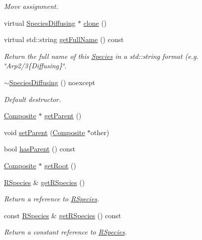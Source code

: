 \begin{DoxyCompactItemize}
\begin{DoxyCompactList}\small\item\em Move assignment. \end{DoxyCompactList}\item 
virtual \hyperlink{classchem_1_1SpeciesDiffusing}{Species\-Diffusing} $\ast$ \hyperlink{classchem_1_1SpeciesDiffusing_a69edbe33378230389a2fb99c4ca2b5ce}{clone} ()
\item 
virtual std\-::string \hyperlink{classchem_1_1SpeciesDiffusing_a03eba31a17a3713e8c45cc0952e922bb}{get\-Full\-Name} () const 
\begin{DoxyCompactList}\small\item\em Return the full name of this \hyperlink{classchem_1_1Species}{Species} in a std\-::string format (e.\-g. \char`\"{}\-Arp2/3\{\-Diffusing\}\char`\"{}. \end{DoxyCompactList}\item 
\hyperlink{classchem_1_1SpeciesDiffusing_a683ab39a97cef1b68be11c68b476a840}{$\sim$\-Species\-Diffusing} () noexcept
\begin{DoxyCompactList}\small\item\em Default destructor. \end{DoxyCompactList}\item 
\hyperlink{classchem_1_1Composite}{Composite} $\ast$ \hyperlink{classchem_1_1Species_acdc83314b339310022d56e024f124a34}{get\-Parent} ()
\item 
void \hyperlink{classchem_1_1Species_a50e1e828d0b8a03efc9354e2c00174f5}{set\-Parent} (\hyperlink{classchem_1_1Composite}{Composite} $\ast$other)
\item 
bool \hyperlink{classchem_1_1Species_a6ddddc5be2b0e4427486f80a891879b3}{has\-Parent} () const 
\item 
\hyperlink{classchem_1_1Composite}{Composite} $\ast$ \hyperlink{classchem_1_1Species_aa5931e2aae4856c1b438691c23ada5aa}{get\-Root} ()
\item 
\hyperlink{classchem_1_1RSpecies}{R\-Species} \& \hyperlink{classchem_1_1Species_a1719a8155a69e9a62593d23d4bfc8514}{get\-R\-Species} ()
\begin{DoxyCompactList}\small\item\em Return a reference to \hyperlink{classchem_1_1RSpecies}{R\-Species}. \end{DoxyCompactList}\item 
const \hyperlink{classchem_1_1RSpecies}{R\-Species} \& \hyperlink{classchem_1_1Species_a438dae186317809effdd040ed38c568b}{get\-R\-Species} () const 
\begin{DoxyCompactList}\small\item\em Return a constant reference to \hyperlink{classchem_1_1RSpecies}{R\-Species}. \end{DoxyCompactList}\item 

\end{DoxyCompactItemize}
